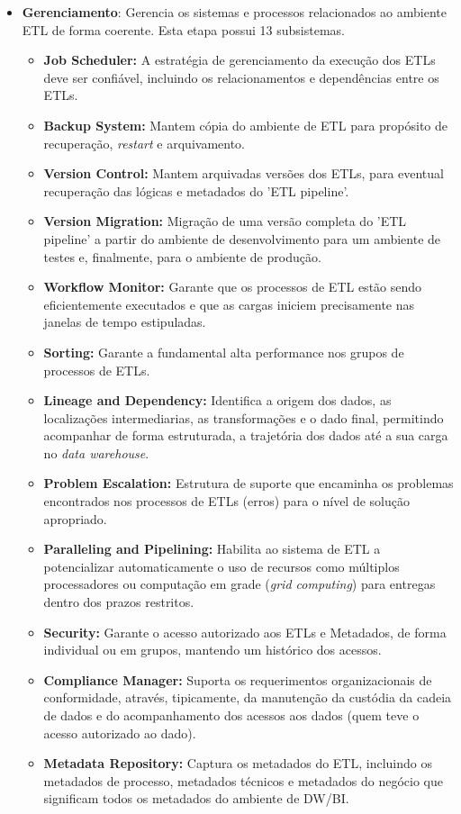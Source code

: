\begin{itemize}
	\item \textbf{Gerenciamento}: Gerencia os sistemas e processos relacionados ao ambiente ETL de forma coerente. Esta etapa possui 13 subsistemas.
		\begin{itemize}
			\item  \textbf{Job Scheduler:} A estratégia de gerenciamento da execução dos ETLs deve ser confiável, incluindo os relacionamentos e dependências entre os ETLs.
			\item \textbf{Backup System:} Mantem cópia do ambiente de ETL para propósito de recuperação, \textit{restart} e arquivamento. 
			\item \textbf{Version Control:} Mantem arquivadas versões dos ETLs, para eventual recuperação das lógicas e metadados do 'ETL pipeline'.
			\item \textbf{Version Migration:} Migração de uma versão completa do 'ETL pipeline' a partir do ambiente de desenvolvimento para um ambiente de testes e, finalmente, para o ambiente de produção.
			\item  \textbf{Workflow Monitor:} Garante que os processos de ETL estão sendo eficientemente executados e que as cargas iniciem precisamente nas janelas de tempo estipuladas.
			\item \textbf{Sorting:} Garante a fundamental alta performance nos grupos de processos de ETLs.
			\item \textbf{Lineage and Dependency:} Identifica a origem dos dados, as localizações intermediarias, as transformações e o dado final, permitindo acompanhar de forma estruturada, a trajetória dos dados até a sua carga no \textit{data warehouse}.
			\item \textbf{Problem Escalation:} Estrutura de suporte que  encaminha os problemas encontrados nos processos de  ETLs (erros)  para o nível de solução apropriado.
			\item \textbf{Paralleling and Pipelining:} Habilita ao sistema de ETL a potencializar automaticamente  o uso de recursos como múltiplos processadores ou computação em grade (\textit{grid computing}) para entregas dentro dos prazos restritos.
			\item \textbf{Security:} Garante o acesso autorizado aos ETLs e Metadados, de forma individual ou em grupos, mantendo um histórico dos acessos.
			\item \textbf{Compliance Manager:} Suporta os requerimentos organizacionais de conformidade, através, tipicamente, da manutenção da custódia da cadeia de dados e do acompanhamento dos acessos aos dados (quem teve o acesso autorizado ao dado).
			\item \textbf{Metadata Repository:} Captura os metadados do ETL, incluindo os metadados de processo, metadados técnicos e metadados do negócio que significam todos os metadados do ambiente de DW/BI.
		\end{itemize}
	
\end{itemize}





